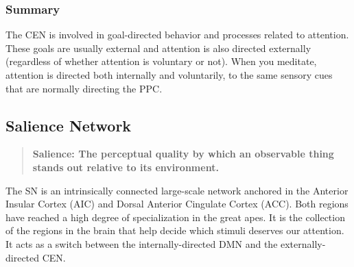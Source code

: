 \documentclass[a4paper, amsfonts, amssymb, amsmath, reprint, showkeys, nofootinbib, twoside]{revtex4-1}
\begin{document}
\subsubsection{Summary}

The CEN is involved in goal-directed behavior and processes
related to attention. These goals are usually external and attention is also directed
externally (regardless of whether attention is voluntary or not). When you meditate,
attention is directed both internally and voluntarily, to the same sensory cues that
are normally directing the PPC.

\subsection{Salience Network}

\begin{quote}
  \textbf{Salience: The perceptual quality by which an observable thing stands out
    relative to its environment.}
\end{quote}

The SN is an intrinsically connected large-scale network anchored in the Anterior
Insular Cortex (AIC) and Dorsal Anterior Cingulate Cortex (ACC). Both regions have reached a
high degree of specialization in the great apes. It is the collection of the regions
in the brain that help decide which stimuli deserves our attention. It acts as a
switch between the internally-directed DMN and the externally-directed CEN. \cite{saliencenetwork}
\end{document}
